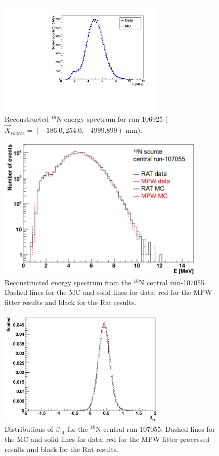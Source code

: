 \begin{figure}[htbp]
	\centering
	\includegraphics[width=8cm]{N16energyMPWcompare_106925.pdf}
	\caption{Reconstructed $^{16}$N energy spectrum for run-106925 ($\vec{X}_{source}=(-186.0,254.0,-4999.899)$ mm).}
	\label{N16_106925}
\end{figure}

\begin{figure}[htbp]
	\centering
	\includegraphics[width=10cm]{N16_reconE_107055.png}
	\caption{Reconstructed energy spectrum from the $^{16}$N central run-107055. Dashed lines for the MC and solid lines for data; red for the MPW fitter results and black for the Rat results.}
	\label{N16energy}
\end{figure}

\begin{figure}[htbp]
	\centering
	\includegraphics[width=8cm]{N16_beta14_107055.png}
	\caption{Distributions of $\beta_{14}$ for the $^{16}$N central run-107055. Dashed lines for the MC and solid lines for data; red for the MPW fitter processed results and black for the Rat results.}
	\label{N16beta14}
\end{figure}

